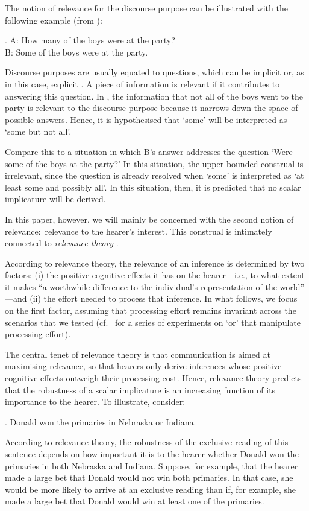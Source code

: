 \documentclass[12pt]{article}
\begin{document}
The notion of relevance for the discourse purpose can be illustrated with the following example (from \citealt{kuppevelt1996}):

\ex.	A: How many of the boys were at the party? \\ B: Some of the boys were at the party.

Discourse purposes are usually equated to questions, which can be implicit or, as in this case, explicit \citep{roberts2012}. A piece of information is relevant if it contributes to answering this question. In \Last, the information that not all of the boys went to the party is relevant to the discourse purpose because it narrows down the space of possible answers. Hence, it is hypothesised that `some' will be interpreted as `some but not all'. 

Compare this to a situation in which B's answer addresses the question `Were some of the boys at the party?' In this situation, the upper-bounded construal is irrelevant, since the question is already resolved when `some' is interpreted as `at least some and possibly all'. In this situation, then, it is predicted that no scalar implicature will be derived.

In this paper, however, we will mainly be concerned with the second notion of relevance:\ relevance to the hearer's interest. This construal is intimately connected to \emph{relevance theory} \citep{sperber1995}.

According to relevance theory, the relevance of an inference is determined by two factors: (i) the positive cognitive effects it has on the hearer---i.e., to what extent it makes ``a worthwhile difference to the individual's representation of the world'' \citep[p.\ 251]{wilson2002}---and (ii) the effort needed to process that inference. In what follows, we focus on the first factor, assuming that processing effort remains invariant across the scenarios that we tested (cf.\ \citealt{chevallier2008} for a series of experiments on `or' that manipulate processing effort). 

The central tenet of relevance theory is that communication is aimed at maximising relevance, so that hearers only derive inferences whose positive cognitive effects outweigh their processing cost. Hence, relevance theory predicts that the robustness of a scalar implicature is an increasing function of its importance to the hearer. To illustrate, consider:

\ex.	Donald won the primaries in Nebraska or Indiana.

According to relevance theory, the robustness of the exclusive reading of this sentence depends on how important it is to the hearer whether Donald won the primaries in both Nebraska and Indiana. Suppose, for example, that the hearer made a large bet that Donald would not win both primaries. In that case, she would be more likely to arrive at an exclusive reading than if, for example, she made a large bet that Donald would win at least one of the primaries.
\end{document}
